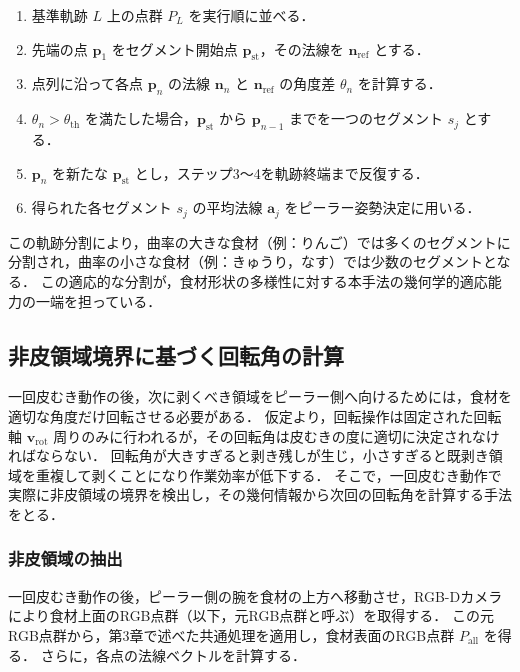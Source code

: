 \begin{enumerate}
  \item 基準軌跡 $L$ 上の点群 $P_L$ を実行順に並べる．
  \item 先端の点 $\mathbf{p}_1$ をセグメント開始点 $\mathbf{p}_{\mathrm{st}}$，その法線を $\mathbf{n}_{\mathrm{ref}}$ とする．
  \item 点列に沿って各点 $\mathbf{p}_n$ の法線 $\mathbf{n}_n$ と $\mathbf{n}_{\mathrm{ref}}$ の角度差 $\theta_n$ を計算する．
  \item $\theta_n > \theta_{\mathrm{th}}$ を満たした場合，$\mathbf{p}_{\mathrm{st}}$ から $\mathbf{p}_{n-1}$ までを一つのセグメント $s_j$ とする．
  \item $\mathbf{p}_n$ を新たな $\mathbf{p}_{\mathrm{st}}$ とし，ステップ3〜4を軌跡終端まで反復する．
  \item 得られた各セグメント $s_j$ の平均法線 $\mathbf{a}_j$ をピーラー姿勢決定に用いる．
\end{enumerate}

この軌跡分割により，曲率の大きな食材（例：りんご）では多くのセグメントに分割され，曲率の小さな食材（例：きゅうり，なす）では少数のセグメントとなる．
この適応的な分割が，食材形状の多様性に対する本手法の幾何学的適応能力の一端を担っている．

\subsection{非皮領域境界に基づく回転角の計算}
\label{sec:peeling_rotation_calc}

一回皮むき動作の後，次に剥くべき領域をピーラー側へ向けるためには，食材を適切な角度だけ回転させる必要がある．
仮定より，回転操作は固定された回転軸 $\mathbf{v}_{\mathrm{rot}}$ 周りのみに行われるが，その回転角は皮むきの度に適切に決定されなければならない．
回転角が大きすぎると剥き残しが生じ，小さすぎると既剥き領域を重複して剥くことになり作業効率が低下する．
そこで，一回皮むき動作で実際に非皮領域の境界を検出し，その幾何情報から次回の回転角を計算する手法をとる．

\subsubsection{非皮領域の抽出}

一回皮むき動作の後，ピーラー側の腕を食材の上方へ移動させ，RGB-Dカメラにより食材上面のRGB点群（以下，元RGB点群と呼ぶ）を取得する．
この元RGB点群から，第3章で述べた共通処理を適用し，食材表面のRGB点群 $P_{\mathrm{all}}$ を得る．
さらに，各点の法線ベクトルを計算する．

